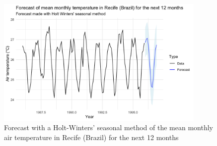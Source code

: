 \begin{figure}[H]
	\centering
	\includegraphics[width=0.9\textwidth]{figures/forecast/hw_forecast.png}
	\caption{Forecast with a Holt-Winters' seasonal method of the mean monthly air temperature in Recife (Brazil) for the next 12 months}
	\label{fig:hw-forecast}
\end{figure}